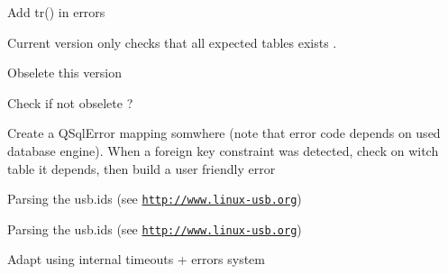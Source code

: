 \begin{DoxyRefList}
\item[\label{todo__todo000058}%
\hypertarget{todo__todo000058}{}%
Member \hyperlink{classmdt_tt_base_a6dbd221d1518e30c3692a7ba54b57c03}{mdt\-Tt\-Base\-:\-:mdt\-Tt\-Base} (\hyperlink{class_q_object}{Q\-Object} $\ast$parent, Q\-Sql\-Database db)]Add tr() in errors  
\item[\label{todo__todo000060}%
\hypertarget{todo__todo000060}{}%
Member \hyperlink{classmdt_tt_database_schema_ace92b340a68ce07ad477502a68de4514}{mdt\-Tt\-Database\-Schema\-:\-:check\-Schema} ()]Current version only checks that all expected tables exists . 
\item[\label{todo__todo000073}%
\hypertarget{todo__todo000073}{}%
Member \hyperlink{classmdt_tt_test_connection_cable_a0fcfed15264ef80fbb9e566aaf0df4e5}{mdt\-Tt\-Test\-Connection\-Cable\-:\-:add\-Link} (const Q\-Variant \&test\-Connection\-Id, const Q\-Variant \&dut\-Connection\-Id, const Q\-Variant \&test\-Cable\-Id, const Q\-Variant \&identification, const Q\-Variant \&value)]Obselete this version  
\item[\label{todo__todo000074}%
\hypertarget{todo__todo000074}{}%
Class \hyperlink{classmdt_tt_test_data}{mdt\-Tt\-Test\-Data} ]Check if not obselete ?  
\item[\label{todo__todo000077}%
\hypertarget{todo__todo000077}{}%
Member \hyperlink{classmdt_tt_test_node_unit_a9da3578291033f5f9d77f186fe2fb325}{mdt\-Tt\-Test\-Node\-Unit\-:\-:get\-Test\-Links\-Depending\-On\-Connection} (const Q\-Variant \&test\-Node\-Unit\-Connection\-Id, bool \&ok)]Create a Q\-Sql\-Error mapping somwhere (note that error code depends on used database engine). When a foreign key constraint was detected, check on witch table it depends, then build a user friendly error  
\item[\label{todo__todo000039}%
\hypertarget{todo__todo000039}{}%
Member \hyperlink{classmdt_usb_device_descriptor_a626afc71d8e72600f12259ac6f5a5866}{mdt\-Usb\-Device\-Descriptor\-:\-:product\-Name} () const ]Parsing the usb.\-ids (see \href{http://www.linux-usb.org}{\tt http\-://www.\-linux-\/usb.\-org})  
\item[\label{todo__todo000038}%
\hypertarget{todo__todo000038}{}%
Member \hyperlink{classmdt_usb_device_descriptor_ac2f746ebd5540b65bf00f82c991f5c3b}{mdt\-Usb\-Device\-Descriptor\-:\-:vendor\-Name} () const ]Parsing the usb.\-ids (see \href{http://www.linux-usb.org}{\tt http\-://www.\-linux-\/usb.\-org})  
\item[\label{todo__todo000040}%
\hypertarget{todo__todo000040}{}%
Member \hyperlink{classmdt_usb_port_manager_a34bf0ac118e586bf2547a98964a2230c}{mdt\-Usb\-Port\-Manager\-:\-:wait\-Readen\-Control\-Response} ()]Adapt using internal timeouts + errors system  

\end{DoxyRefList}
